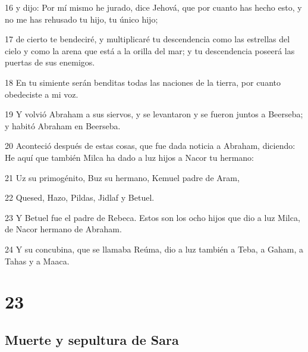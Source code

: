 \par 16 y dijo: Por mí mismo he jurado, dice Jehová, que por cuanto has hecho esto, y no me has rehusado tu hijo, tu único hijo;
\par 17 de cierto te bendeciré, y multiplicaré tu descendencia como las estrellas del cielo y como la arena que está a la orilla del mar; y tu descendencia poseerá las puertas de sus enemigos.
\par 18 En tu simiente serán benditas todas las naciones de la tierra, por cuanto obedeciste a mi voz.
\par 19 Y volvió Abraham a sus siervos, y se levantaron y se fueron juntos a Beerseba; y habitó Abraham en Beerseba.
\par 20 Aconteció después de estas cosas, que fue dada noticia a Abraham, diciendo: He aquí que también Milca ha dado a luz hijos a Nacor tu hermano:
\par 21 Uz su primogénito, Buz su hermano, Kemuel padre de Aram,
\par 22 Quesed, Hazo, Pildas, Jidlaf y Betuel.
\par 23 Y Betuel fue el padre de Rebeca. Estos son los ocho hijos que dio a luz Milca, de Nacor hermano de Abraham.
\par 24 Y su concubina, que se llamaba Reúma, dio a luz también a Teba, a Gaham, a Tahas y a Maaca.


\chapter{23}

\section*{Muerte y sepultura de Sara}

